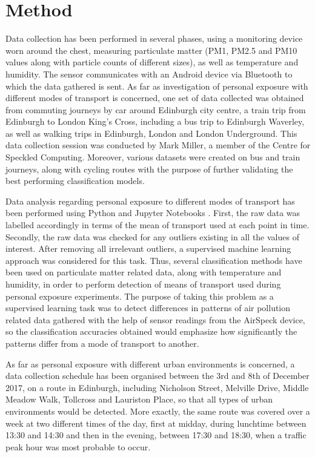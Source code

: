 \documentclass[bsc,frontabs,twoside,singlespacing, parskip,deptreport]{infthesis}     %
\begin{document}
\section{Method}

Data collection has been performed in several phases, using a monitoring device worn around the chest, measuring particulate matter (PM1, PM2.5 and PM10 values along with particle counts of different sizes), as well as temperature and humidity. The sensor communicates with an Android device via Bluetooth to which the data gathered is sent. As far as investigation of personal exposure with different modes of transport is concerned, one set of data collected was obtained from commuting journeys by car around Edinburgh city centre, a train trip from Edinburgh to London King's Cross, including a bus trip to Edinburgh Waverley, as well as walking trips in Edinburgh, London and London Underground. This data collection session was conducted by Mark Miller, a member of the Centre for Speckled Computing. Moreover, various datasets were created on bus and train journeys, along with cycling routes with the purpose of further validating the best performing classification models.

Data analysis regarding personal exposure to different modes of transport has been performed using Python and Jupyter Notebooks \cite{jupyter}. First, the raw data was labelled accordingly in terms of the mean of transport used at each point in time. Secondly, the raw data was checked for any outliers existing in all the values of interest. After removing all irrelevant outliers, a supervised machine learning approach was considered for this task. Thus, several classification methods have been used on particulate matter related data, along with temperature and humidity, in order to perform detection of means of transport used during personal exposure experiments. The purpose of taking this problem as a supervised learning task was to detect differences in patterns of air pollution related data gathered with the help of sensor readings from the AirSpeck device, so the classification accuracies obtained would emphasize how significantly the patterns differ from a mode of transport to another.

As far as personal exposure with different urban environments is concerned, a data collection schedule has been organised between the 3rd and 8th of December 2017, on a route in Edinburgh, including Nicholson Street, Melville Drive, Middle Meadow Walk, Tollcross and Lauriston Place, so that all types of urban environments would be detected. More exactly, the same route was covered over a week at two different times of the day, first at midday, during lunchtime between 13:30 and 14:30 and then in the evening, between 17:30 and 18:30, when a traffic peak hour was most probable to occur.
\end{document}
